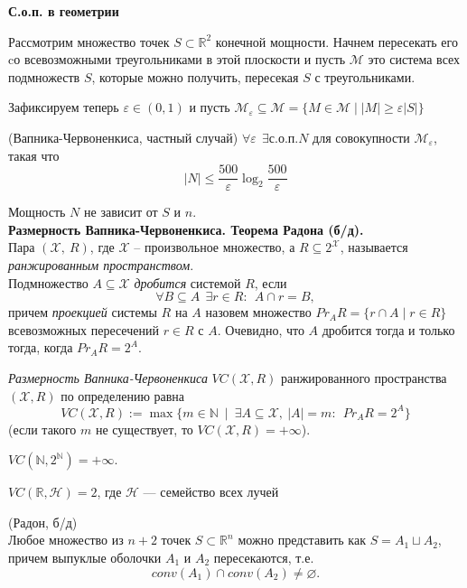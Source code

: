 \textbf{С.о.п. в геометрии}

Рассмотрим множество точек $S \subset \mathbb{R}^2$ конечной мощности. Начнем пересекать его cо всевозможными треугольниками в этой плоскости и пусть $\mathcal{M}$ это система всех подмножеств $S$, которые можно получить, пересекая $S$ с треугольниками. 

Зафиксируем теперь $\varepsilon \in (0, 1)$ и пусть $\mathcal{M}_\varepsilon \subseteq \mathcal{M} = \{ M \in \mathcal{M} \mid |M| \geqslant \varepsilon|S| \}$

\Th (Вапника-Червоненкиса, частный случай) $\forall \varepsilon\:\: \exists \text{с.о.п.} N $ для совокупности $\mathcal{M}_\varepsilon$, такая что $$ |N| \leqslant \frac{500}{\varepsilon} \log_2 \frac{500}{\varepsilon}$$

\Note Мощность $N$ не зависит от $S$ и $n$.\\

\textbf{Размерность Вапника-Червоненкиса. Теорема Радона (б/д).}\\

\Def Пара $(\mathcal{X},\: R)$, где $\mathcal{X}$ -- произвольное множество, а $R \subseteq 2^{\mathcal{X}}$,  называется {\it ранжированным пространством}. \\ 

\Def Подмножество $A \subseteq \mathcal{X}$ {\it дробится} системой $R$, если $$\forall B \subseteq A\:\: \exists r \in R:\:\: A\cap r = B,$$
причем \textit{проекцией} системы $R$ на $A$ назовем множество $Pr_A R = \{ r \cap A \mid r \in R\}$ всевозможных пересечений $r\in R$ с $A$. Очевидно, что $A$ дробится тогда и только тогда, когда $Pr_A R = 2^A$.

\Def \textit{Размерность Вапника-Червоненкиса} $VC(\mathcal{X}, R)$ ранжированного пространства $(\mathcal{X}, R)$ по определению равна$$ VC(\mathcal{X}, R) := \max \{m \in \mathbb{N}\: \mid\: \exists A \subseteq \mathcal{X},\: |A| = m:\:\: Pr_A R = 2^A \}$$
    (если такого $m$ не существует, то $VC(\mathcal{X}, R) = +\infty$).

\Example $VC(\mathbb{N}, 2^{\mathbb{N}}) = +\infty$.

\Example $VC(\mathbb{R}, \mathcal{H}) = 2$, где $\mathcal{H}$ --- семейство всех лучей

\Th (Радон, б/д)\\
Любое множество из $n+2$ точек $S \subset \mathbb{R}^n$ можно представить как $S = A_1 \sqcup A_2$, причем выпуклые оболочки $A_1$ и $A_2$ пересекаются, т.е. $$ conv(A_1) \cap conv(A_2) \neq \varnothing.$$ 

